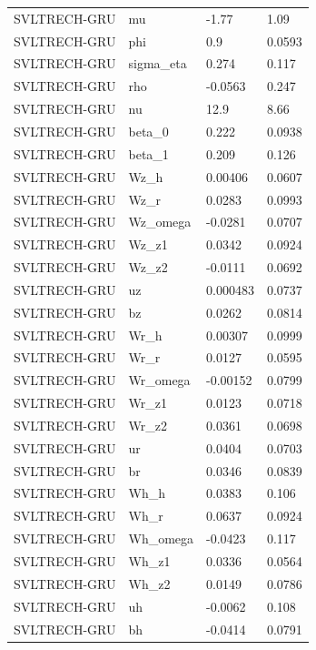 \begin{table}[htbp]
\begin{tabular}{llll}
SVLTRECH-GRU & mu & -1.77 & 1.09 \\
SVLTRECH-GRU & phi & 0.9 & 0.0593 \\
SVLTRECH-GRU & sigma\_eta & 0.274 & 0.117 \\
SVLTRECH-GRU & rho & -0.0563 & 0.247 \\
SVLTRECH-GRU & nu & 12.9 & 8.66 \\
SVLTRECH-GRU & beta\_0 & 0.222 & 0.0938 \\
SVLTRECH-GRU & beta\_1 & 0.209 & 0.126 \\
SVLTRECH-GRU & Wz\_h & 0.00406 & 0.0607 \\
SVLTRECH-GRU & Wz\_r & 0.0283 & 0.0993 \\
SVLTRECH-GRU & Wz\_omega & -0.0281 & 0.0707 \\
SVLTRECH-GRU & Wz\_z1 & 0.0342 & 0.0924 \\
SVLTRECH-GRU & Wz\_z2 & -0.0111 & 0.0692 \\
SVLTRECH-GRU & uz & 0.000483 & 0.0737 \\
SVLTRECH-GRU & bz & 0.0262 & 0.0814 \\
SVLTRECH-GRU & Wr\_h & 0.00307 & 0.0999 \\
SVLTRECH-GRU & Wr\_r & 0.0127 & 0.0595 \\
SVLTRECH-GRU & Wr\_omega & -0.00152 & 0.0799 \\
SVLTRECH-GRU & Wr\_z1 & 0.0123 & 0.0718 \\
SVLTRECH-GRU & Wr\_z2 & 0.0361 & 0.0698 \\
SVLTRECH-GRU & ur & 0.0404 & 0.0703 \\
SVLTRECH-GRU & br & 0.0346 & 0.0839 \\
SVLTRECH-GRU & Wh\_h & 0.0383 & 0.106 \\
SVLTRECH-GRU & Wh\_r & 0.0637 & 0.0924 \\
SVLTRECH-GRU & Wh\_omega & -0.0423 & 0.117 \\
SVLTRECH-GRU & Wh\_z1 & 0.0336 & 0.0564 \\
SVLTRECH-GRU & Wh\_z2 & 0.0149 & 0.0786 \\
SVLTRECH-GRU & uh & -0.0062 & 0.108 \\
SVLTRECH-GRU & bh & -0.0414 & 0.0791 \\
\bottomrule
\end{tabular}
\end{table}